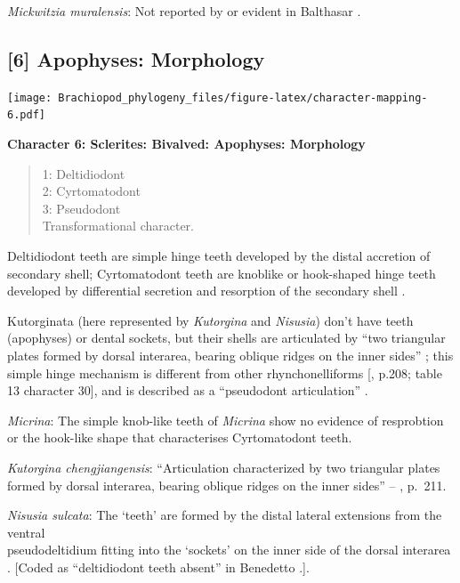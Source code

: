 \documentclass[openany]{book}
\theoremstyle{definition}
\theoremstyle{definition}
\theoremstyle{definition}
\theoremstyle{remark}
\begin{document}
\emph{Mickwitzia muralensis}: Not reported by or evident in Balthasar
\citeyearpar{Balthasar2004Shellstructure}.

\hypertarget{apophyses-morphology}{%
\subsection*{{[}6{]} Apophyses: Morphology}\label{apophyses-morphology}}

\texttt{[image: Brachiopod\_phylogeny\_files/figure-latex/character-mapping-6.pdf]}

\textbf{Character 6: Sclerites: Bivalved: Apophyses: Morphology}

\begin{quote}
1: Deltidiodont\\
2: Cyrtomatodont\\
3: Pseudodont\\
Transformational character.
\end{quote}

Deltidiodont teeth are simple hinge teeth developed by the distal
accretion of secondary shell; Cyrtomatodont teeth are knoblike or
hook-shaped hinge teeth developed by differential secretion and
resorption of the secondary shell \citep[fig. 322
in][]{Williams2000BrachiopodaLinguliformea}.

Kutorginata (here represented by \emph{Kutorgina} and \emph{Nisusia})
don't have teeth (apophyses) or dental sockets, but their shells are
articulated by ``two triangular plates formed by dorsal interarea,
bearing oblique ridges on the inner sides''
\citep[p.~211]{Williams2000BrachiopodaLinguliformea}; this simple hinge
mechanism is different from other rhynchonelliforms
{[}\citet{Williams2000BrachiopodaLinguliformea}, p.208; table 13
character 30{]}, and is described as a ``pseudodont articulation''
\citep{Holmer2018Evolutionarysignificance}.

\emph{Micrina}: The simple knob-like teeth of \emph{Micrina} show no
evidence of resprobtion or the hook-like shape that characterises
Cyrtomatodont teeth.

\emph{Kutorgina chengjiangensis}: ``Articulation characterized by two
triangular plates formed by dorsal interarea, bearing oblique ridges on
the inner sides'' -- \citet{Williams2000BrachiopodaLinguliformea},
p.~211.

\emph{Nisusia sulcata}: The `teeth' are formed by the distal lateral
extensions from the ventral\\
pseudodeltidium fitting into the `sockets' on the inner side of the
dorsal interarea \citep{Holmer2018Evolutionarysignificance}. {[}Coded as
``deltidiodont teeth absent'' in Benedetto
\citeyearpar{Benedetto2009iChaniella}.{]}.
\end{document}
